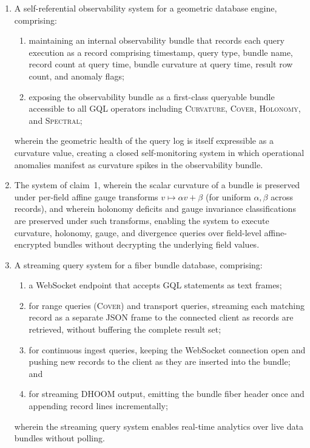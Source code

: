 \documentclass[11pt,letterpaper]{article}
\begin{document}
\begin{enumerate}
\item A self-referential observability system for a geometric database engine, comprising:
\begin{enumerate}[label=(\alph*)]
  \item maintaining an internal observability bundle that records each query execution as a record comprising timestamp, query type, bundle name, record count at query time, bundle curvature at query time, result row count, and anomaly flags;
  \item exposing the observability bundle as a first-class queryable bundle accessible to all GQL operators including \textsc{Curvature}, \textsc{Cover}, \textsc{Holonomy}, and \textsc{Spectral};
\end{enumerate}
wherein the geometric health of the query log is itself expressible as a curvature value, creating a closed self-monitoring system in which operational anomalies manifest as curvature spikes in the observability bundle.

\item The system of claim~1, wherein the scalar curvature of a bundle is preserved under per-field affine gauge transforms $v \mapsto \alpha v + \beta$ (for uniform $\alpha, \beta$ across records), and wherein holonomy deficits and gauge invariance classifications are preserved under such transforms, enabling the system to execute curvature, holonomy, gauge, and divergence queries over field-level affine-encrypted bundles without decrypting the underlying field values.

\item A streaming query system for a fiber bundle database, comprising:
\begin{enumerate}[label=(\alph*)]
  \item a WebSocket endpoint that accepts GQL statements as text frames;
  \item for range queries (\textsc{Cover}) and transport queries, streaming each matching record as a separate JSON frame to the connected client as records are retrieved, without buffering the complete result set;
  \item for continuous ingest queries, keeping the WebSocket connection open and pushing new records to the client as they are inserted into the bundle; and
  \item for streaming DHOOM output, emitting the bundle fiber header once and appending record lines incrementally;
\end{enumerate}
wherein the streaming query system enables real-time analytics over live data bundles without polling.


\end{enumerate}
\end{document}
